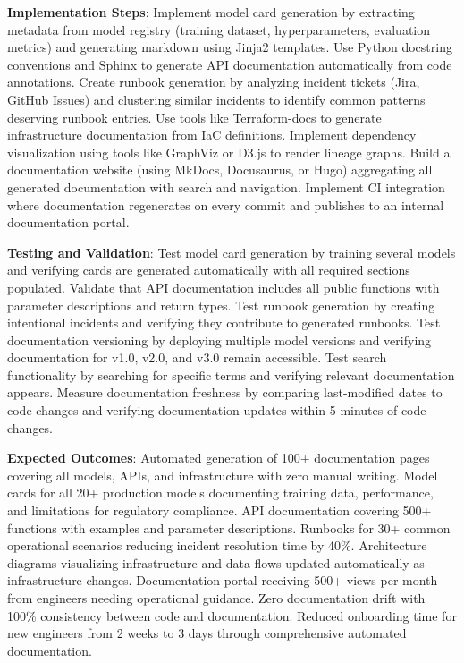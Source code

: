 \textbf{Implementation Steps}: Implement model card generation by extracting metadata from model registry (training dataset, hyperparameters, evaluation metrics) and generating markdown using Jinja2 templates. Use Python docstring conventions and Sphinx to generate API documentation automatically from code annotations. Create runbook generation by analyzing incident tickets (Jira, GitHub Issues) and clustering similar incidents to identify common patterns deserving runbook entries. Use tools like Terraform-docs to generate infrastructure documentation from IaC definitions. Implement dependency visualization using tools like GraphViz or D3.js to render lineage graphs. Build a documentation website (using MkDocs, Docusaurus, or Hugo) aggregating all generated documentation with search and navigation. Implement CI integration where documentation regenerates on every commit and publishes to an internal documentation portal.

\textbf{Testing and Validation}: Test model card generation by training several models and verifying cards are generated automatically with all required sections populated. Validate that API documentation includes all public functions with parameter descriptions and return types. Test runbook generation by creating intentional incidents and verifying they contribute to generated runbooks. Test documentation versioning by deploying multiple model versions and verifying documentation for v1.0, v2.0, and v3.0 remain accessible. Test search functionality by searching for specific terms and verifying relevant documentation appears. Measure documentation freshness by comparing last-modified dates to code changes and verifying documentation updates within 5 minutes of code changes.

\textbf{Expected Outcomes}: Automated generation of 100+ documentation pages covering all models, APIs, and infrastructure with zero manual writing. Model cards for all 20+ production models documenting training data, performance, and limitations for regulatory compliance. API documentation covering 500+ functions with examples and parameter descriptions. Runbooks for 30+ common operational scenarios reducing incident resolution time by 40\%. Architecture diagrams visualizing infrastructure and data flows updated automatically as infrastructure changes. Documentation portal receiving 500+ views per month from engineers needing operational guidance. Zero documentation drift with 100\% consistency between code and documentation. Reduced onboarding time for new engineers from 2 weeks to 3 days through comprehensive automated documentation.

